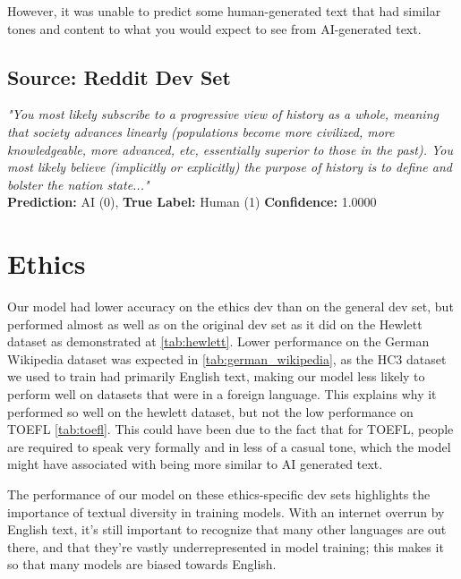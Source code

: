 \documentclass[11pt]{article}
\begin{document}
However, it was unable to predict some human-generated text that had similar tones and content to what you would expect to see from AI-generated text.

\subsection*{Source: Reddit Dev Set}
\noindent
\textit{"You most likely subscribe to a progressive view of history as a whole, meaning that society advances linearly (populations become more civilized, more knowledgeable, more advanced, etc, essentially superior to those in the past). You most likely believe (implicitly or explicitly) the purpose of history is to define and bolster the nation state..."} \\
\textbf{Prediction:} AI (0), \textbf{True Label:} Human (1) \quad \textbf{Confidence:} 1.0000

\section{Ethics}
\label{sec:ethics}
Our model had lower accuracy on the ethics dev than on the general dev set, but performed almost as well as on the original dev set as it did on the Hewlett dataset as demonstrated at \autoref{tab:hewlett}. Lower performance on the German Wikipedia dataset was expected in \autoref{tab:german_wikipedia}, as the HC3 dataset we used to train had primarily English text, making our model less likely to perform well on datasets that were in a foreign language. This explains why it performed so well on the hewlett dataset, but not the low performance on TOEFL \autoref{tab:toefl}. This could have been due to the fact that for TOEFL, people are required to speak very formally and in less of a casual tone, which the model might have associated with being more similar to AI generated text. 

The performance of our model on these ethics-specific dev sets highlights the importance of textual diversity in training models. With an internet overrun by English text, it's still important to recognize that many other languages are out there, and that they're vastly underrepresented in model training; this makes it so that many models are biased towards English.
\begin{table}[ht]
\centering
\caption{Report for \texttt{hewlett.json}}
\label{tab:hewlett}
\end{table}
\end{document}
